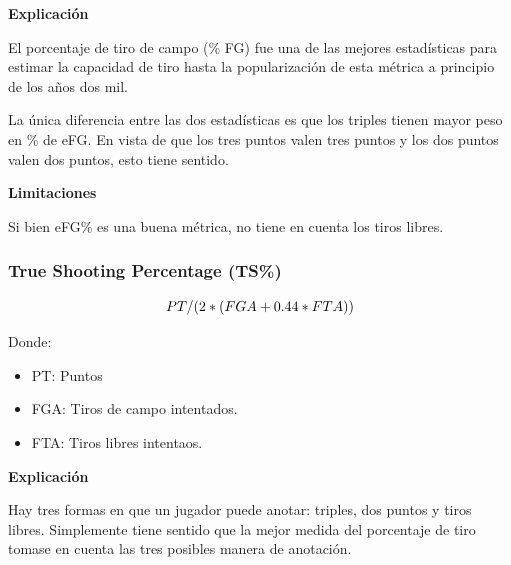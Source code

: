 \documentclass[
]{article}
\newenvironment{Shaded}{\begin{snugshade}}{\end{snugshade}}
\newcommand{\DecValTok}[1]{\textcolor[rgb]{0.00,0.00,0.81}{#1}}
\newcommand{\FloatTok}[1]{\textcolor[rgb]{0.00,0.00,0.81}{#1}}
\newcommand{\KeywordTok}[1]{\textcolor[rgb]{0.13,0.29,0.53}{\textbf{#1}}}
\newcommand{\NormalTok}[1]{#1}
\newcommand{\OperatorTok}[1]{\textcolor[rgb]{0.81,0.36,0.00}{\textbf{#1}}}
\newcommand{\StringTok}[1]{\textcolor[rgb]{0.31,0.60,0.02}{#1}}
\providecommand{\tightlist}{%
  \setlength{\itemsep}{0pt}\setlength{\parskip}{0pt}}
\begin{document}
\textbf{Explicación}

El porcentaje de tiro de campo (\% FG) fue una de las mejores
estadísticas para estimar la capacidad de tiro hasta la popularización
de esta métrica a principio de los años dos mil.

La única diferencia entre las dos estadísticas es que los triples tienen
mayor peso en \% de eFG. En vista de que los tres puntos valen tres
puntos y los dos puntos valen dos puntos, esto tiene sentido.

\textbf{Limitaciones}

Si bien eFG\% es una buena métrica, no tiene en cuenta los tiros libres.

\begin{Shaded}
\end{Shaded}

\hypertarget{true-shooting-percentage-ts}{%
\subsubsection{True Shooting Percentage
(TS\%)}\label{true-shooting-percentage-ts}}

\[
  \makebox[\linewidth]{$PT/(2*(FGA+0.44*FTA))$}
\]

Donde:

\begin{itemize}
\tightlist
\item
  PT: Puntos
\item
  FGA: Tiros de campo intentados.
\item
  FTA: Tiros libres intentaos.
\end{itemize}

\textbf{Explicación}

Hay tres formas en que un jugador puede anotar: triples, dos puntos y
tiros libres. Simplemente tiene sentido que la mejor medida del
porcentaje de tiro tomase en cuenta las tres posibles manera de
anotación.
\end{document}
